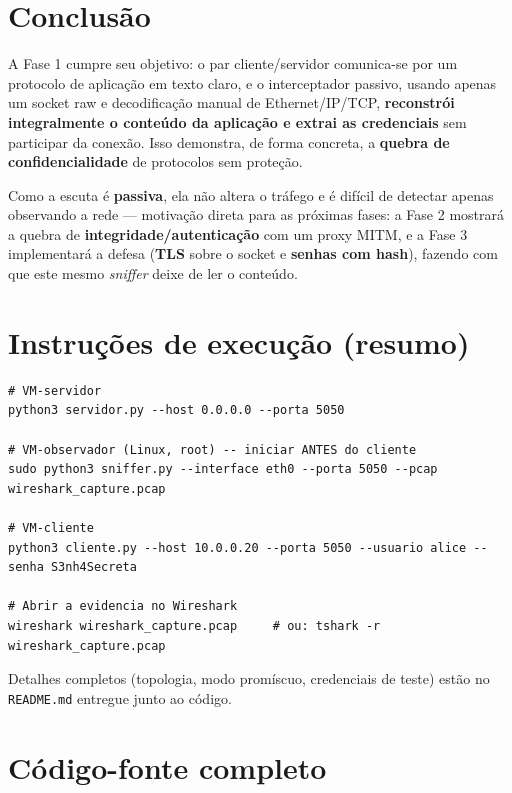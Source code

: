 \documentclass[11pt,a4paper]{article}
\begin{document}
\section{Conclusão}

A Fase 1 cumpre seu objetivo: o par cliente/servidor comunica-se por um protocolo
de aplicação em texto claro, e o interceptador passivo, usando apenas um socket
raw e decodificação manual de Ethernet/IP/TCP, \textbf{reconstrói integralmente o
conteúdo da aplicação e extrai as credenciais} sem participar da conexão. Isso
demonstra, de forma concreta, a \textbf{quebra de confidencialidade} de
protocolos sem proteção.

Como a escuta é \textbf{passiva}, ela não altera o tráfego e é difícil de
detectar apenas observando a rede — motivação direta para as próximas fases: a
Fase 2 mostrará a quebra de \textbf{integridade/autenticação} com um proxy MITM,
e a Fase 3 implementará a defesa (\textbf{TLS} sobre o socket e \textbf{senhas com
hash}), fazendo com que este mesmo \textit{sniffer} deixe de ler o conteúdo.

\appendix
\newpage
\section{Instruções de execução (resumo)}
\label{ap:exec}

\begin{lstlisting}[style=saida]
# VM-servidor
python3 servidor.py --host 0.0.0.0 --porta 5050

# VM-observador (Linux, root) -- iniciar ANTES do cliente
sudo python3 sniffer.py --interface eth0 --porta 5050 --pcap wireshark_capture.pcap

# VM-cliente
python3 cliente.py --host 10.0.0.20 --porta 5050 --usuario alice --senha S3nh4Secreta

# Abrir a evidencia no Wireshark
wireshark wireshark_capture.pcap     # ou: tshark -r wireshark_capture.pcap
\end{lstlisting}

Detalhes completos (topologia, modo promíscuo, credenciais de teste) estão no
\texttt{README.md} entregue junto ao código.

\newpage
\section{Código-fonte completo}
\label{ap:codigo}
\end{document}
